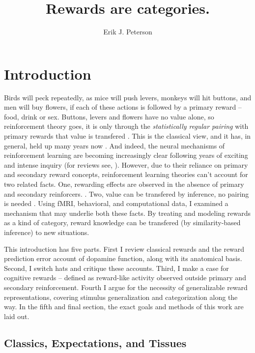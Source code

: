 \documentclass[doc,12pt]{apa}        %
\title{Rewards are categories.}
\author{Erik J. Peterson} \affiliation{Dept. of Psychology \\ Colorado State University \\ Fort Collins, CO}
\begin{document}
 
\maketitle
\doublespacing
\newpage
\tableofcontents
\newpage
\section{Introduction} %
\label{sec:introduction}
Birds will peck repeatedly, as mice will push levers, monkeys will hit buttons, and men will buy flowers, if each of these actions is followed by a primary reward -- food, drink or sex.  Buttons, levers and flowers have no value alone, so reinforcement theory goes, it is only through the \emph{statistically regular pairing} with primary rewards that value is transfered \cite{Rescorla:1988p8743}.  This is the classical view, and it has, in general, held up many years now \cite{iversen:2007aa}.  And indeed, the neural mechanisms of reinforcement learning are becoming increasingly clear following years of exciting and intense inquiry (for reviews see, ).  However, due to their reliance on primary and secondary reward concepts, reinforcement learning theories can't account for two related facts.  One, rewarding effects are observed in the absence of primary and secondary reinforcers.  \cite{Hayden:2009p6545, Lohrenz:2007p7240, Tricomi:2008p6663, Jimura:2010p8305}. Two, value can be transfered by inference, no pairing is needed \cite{BrombergMartin:2010p7223, Hampton:2006p2577}.  Using fMRI, behavioral, and computational data, I examined a mechanism that may underlie both these facts.  By treating and modeling rewards as a kind of category, reward knowledge can be transfered (by similarity-based inference) to new situations.

This introduction has five parts.  First I review classical rewards and the reward prediction error account of dopamine function, along with its anatomical basis.  Second, I switch hats and critique these accounts. Third, I make a case for cognitive rewards -- defined as reward-like activity observed outside primary and secondary reinforcement. Fourth I argue for the necessity of generalizable reward representations, covering stimulus generalization and categorization along the way.  In the fifth and final section, the exact goals and methods of this work are laid out.

\subsection{Classics, Expectations, and Tissues} %
\label{sub:cet}
\end{document}
